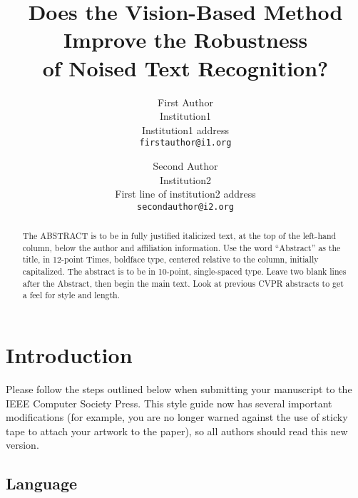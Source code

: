 \documentclass[10pt,twocolumn,letterpaper]{article}
\begin{document}
\title{Does the Vision-Based Method Improve the Robustness\\ of Noised Text Recognition?}

\author{First Author\\
Institution1\\
Institution1 address\\
{\tt\small firstauthor@i1.org}
\and
Second Author\\
Institution2\\
First line of institution2 address\\
{\tt\small secondauthor@i2.org}
}
\maketitle

\begin{abstract}
   The ABSTRACT is to be in fully justified italicized text, at the top of the left-hand column, below the author and affiliation information.
   Use the word ``Abstract'' as the title, in 12-point Times, boldface type, centered relative to the column, initially capitalized.
   The abstract is to be in 10-point, single-spaced type.
   Leave two blank lines after the Abstract, then begin the main text.
   Look at previous CVPR abstracts to get a feel for style and length.
\end{abstract}

\section{Introduction}
\label{sec:intro}

Please follow the steps outlined below when submitting your manuscript to the IEEE Computer Society Press.
This style guide now has several important modifications (for example, you are no longer warned against the use of sticky tape to attach your artwork to the paper), so all authors should read this new version.

\subsection{Language}
\end{document}
